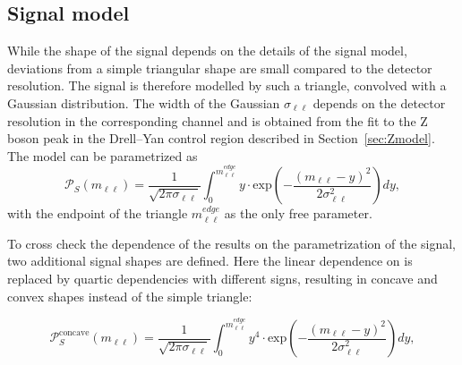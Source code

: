 \subsection{Signal model}
While the shape of the signal depends on the details of the signal model, deviations from a simple triangular shape are small compared to the detector resolution. The signal is therefore modelled by such a triangle, convolved with a Gaussian distribution. The width of the Gaussian $\sigma_{\ell\ell}$ depends on the detector resolution in the corresponding channel and is obtained from the fit to the Z boson peak in the Drell--Yan control region described in Section~\ref{sec:Zmodel}. The model can be parametrized as
\begin{equation*}
 {\mathcal{P}}_{S}(m_{\ell\ell}) = \frac{1}{\sqrt{2\pi\sigma_{\ell\ell}}} \int_{0}^{m_{\ell\ell}^{edge}} y \cdot \textrm{exp}\left( -\frac{(m_{\ell\ell}-y)^2}{2\sigma_{\ell\ell}^{2}}\right) dy,
\end{equation*}
with the endpoint of the triangle $m_{\ell\ell}^{edge}$ as the only free parameter.

To cross check the dependence of the results on the parametrization of the signal, two additional signal shapes are defined. Here the linear dependence on \mll is replaced by quartic dependencies with different signs, resulting in concave and convex shapes instead of the simple triangle:

\begin{equation*}
 {\mathcal{P}}^{\text{concave}}_{S}(m_{\ell\ell}) = \frac{1}{\sqrt{2\pi\sigma_{\ell\ell}}} \int_{0}^{m_{\ell\ell}^{edge}} y^4 \cdot \textrm{exp}\left( -\frac{(m_{\ell\ell}-y)^2}{2\sigma_{\ell\ell}^{2}}\right) dy,
\end{equation*}

